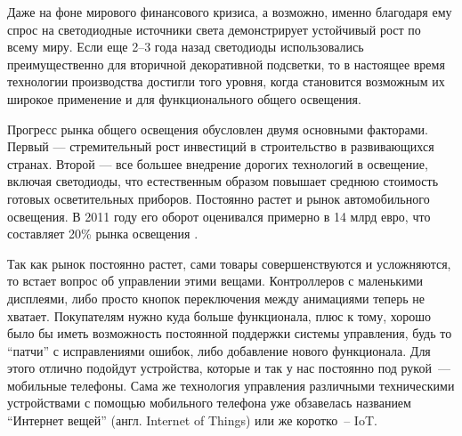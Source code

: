 Даже на фоне мирового финансового кризиса, а возможно, именно благодаря ему спрос на светодиодные источники света демонстрирует устойчивый рост по всему миру. Если еще 2–3 года назад светодиоды использовались преимущественно для вторичной декоративной подсветки, то в настоящее время технологии производства достигли того уровня, когда становится возможным их широкое применение и для функционального общего освещения.

Прогресс рынка общего освещения обусловлен двумя основными факторами. Первый — стремительный рост инвестиций в строительство в развивающихся странах. Второй — все большее внедрение дорогих технологий в освещение, включая светодиоды, что естественным образом повышает среднюю стоимость готовых осветительных приборов. Постоянно растет и рынок автомобильного освещения. В 2011 году его оборот оценивался примерно в 14 млрд евро, что составляет 20\% рынка освещения \cite{lightIndustry}.

Так как рынок постоянно растет, сами товары совершенствуются и усложняются, то встает вопрос об управлении этими вещами. Контроллеров с маленькими дисплеями, либо просто кнопок переключения между анимациями теперь не хватает. Покупателям нужно куда больше функционала, плюс к тому, хорошо было бы иметь возможность постоянной поддержки системы управления, будь то \enquote{патчи} с исправлениями ошибок, либо добавление нового функционала. Для этого отлично подойдут устройства, которые и так у нас постоянно под рукой~--- мобильные телефоны. Сама же технология управления различными техническими устройствами с помощью мобильного телефона уже обзавелась названием \enquote{Интернет вещей} (англ. Internet of Things) или же коротко~-- IoT.